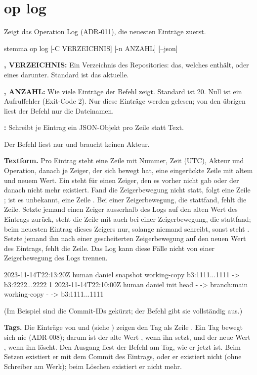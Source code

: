 \section{op log}

Zeigt das Operation Log (ADR-011), die neuesten Einträge zuerst.

\starttyping
stemma op log [-C VERZEICHNIS] [-n ANZAHL] [--json]
\stoptyping

\startitemize
\item {\bf {},  VERZEICHNIS:} Ein Verzeichnis des Repositories:
das, welches  enthält, oder eines darunter. Standard ist das aktuelle.
\item {\bf {},  ANZAHL:} Wie viele Einträge der Befehl zeigt.
Standard ist 20. Null ist ein Aufruffehler (Exit-Code 2). Nur diese Einträge werden
gelesen; von den übrigen liest der Befehl nur die Dateinamen.
\item {\bf {}:} Schreibt je Eintrag ein JSON-Objekt pro Zeile statt Text.
\stopitemize

Der Befehl liest nur und braucht keinen Akteur.

{\bf Textform.} Pro Eintrag steht eine Zeile mit Nummer, Zeit (UTC), Akteur und Operation, danach je
Zeiger, der sich bewegt hat, eine eingerückte Zeile mit altem und neuem Wert.
Ein \type{-} steht für einen Zeiger, den es vorher nicht gab oder der danach nicht mehr existiert.
Fand die Zeigerbewegung nicht statt, folgt eine Zeile ;
ist es unbekannt, eine Zeile .
Bei einer Zeigerbewegung, die stattfand, fehlt die Zeile. Setzte jemand einen Zeiger ausserhalb des
Logs auf den alten Wert des Eintrags zurück, steht die Zeile mit \type{!} auch bei einer
Zeigerbewegung, die stattfand; beim neuesten Eintrag dieses Zeigers nur, solange niemand schreibt,
sonst steht . Setzte jemand ihn nach einer gescheiterten Zeigerbewegung auf den neuen Wert
des Eintrags, fehlt die Zeile. Das Log kann diese Fälle nicht von einer Zeigerbewegung des Logs
trennen.

  2023-11-14T22:13:20Z  human daniel  snapshot
    working-copy  b3:1111...1111 -> b3:2222...2222
1  2023-11-14T22:10:00Z  human daniel  init
    head  - -> branch:main
    working-copy  - -> b3:1111...1111
\stoptyping

(Im Beispiel sind die Commit-IDs gekürzt; der Befehl gibt sie vollständig aus.)

{\bf Tags.} Die Einträge von  und  (siehe ) zeigen den Tag
als Zeile . Ein Tag bewegt sich nie (ADR-008); darum ist der alte Wert \type{-}, wenn
 ihn setzt, und der neue Wert \type{-}, wenn  ihn löscht.
Den Ausgang liest der Befehl am Tag, wie er jetzt ist. Beim Setzen existiert er mit dem Commit des
Eintrags, oder er existiert nicht (ohne Schreiber am Werk); beim Löschen existiert er nicht mehr.

